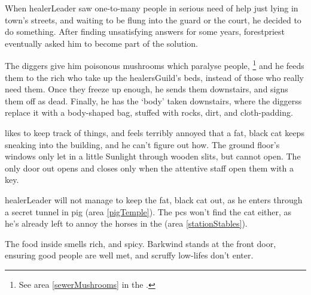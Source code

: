 \begin{multicols}{2}
\begin{exampletext}
  When \gls{healerLeader} saw one-to-many people in serious need of help just lying in \gls{town}'s streets, and waiting to be flung into the \gls{guard} or the \gls{court}, he decided to do something.
  After finding unsatisfying answers for some years, \gls{forestpriest} eventually asked him to become part of the solution.

  The \gls{diggers} give him poisonous mushrooms which paralyse people,
  \footnote{See area \vref{sewerMushrooms} in the .}
  and he feeds them to the rich who take up the \gls{healersGuild}'s beds, instead of those who really need them.
  Once they freeze up enough, he sends them downstairs, and signs them off as dead.
  Finally, he has the `body' taken downstairs, where the \glspl{diggers} replace it with a body-shaped bag, stuffed with rocks, dirt, and cloth-padding.
\end{exampletext}

 likes to keep track of things, and feels terribly annoyed that a fat, black cat keeps sneaking into the building, and he can't figure out how.
The ground floor's windows only let in a little Sunlight through wooden slits, but cannot open.
The only door out opens and closes only when the attentive staff open them with a key.

\Gls{healerLeader} will not manage to keep the fat, black cat out, as he enters through a secret tunnel in \gls{pig} (area \vref{pigTemple}).
The \glspl{pc} won't find the cat either, as he's already left to annoy the horses in the  (area \vref{stationStables}).

\healerLeader

The food inside smells rich, and spicy.
Barkwind stands at the front door, ensuring good people are well met, and scruffy low-lifes don't enter.

\end{multicols}
